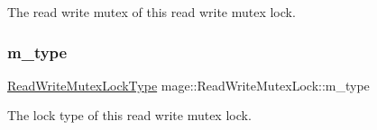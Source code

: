 The read write mutex of this read write mutex lock. \hypertarget{structmage_1_1_read_write_mutex_lock_aa117ffe94f6850ddc91ad6d1389fb6e2}{}\label{structmage_1_1_read_write_mutex_lock_aa117ffe94f6850ddc91ad6d1389fb6e2} 
\subsubsection{\texorpdfstring{m\+\_\+type}{m\_type}}
{\footnotesize\ttfamily \hyperlink{namespacemage_afd76fcca37ce5c5b2227671290973c74}{Read\+Write\+Mutex\+Lock\+Type} mage\+::\+Read\+Write\+Mutex\+Lock\+::m\+\_\+type\hspace{0.3cm}{\ttfamily [private]}}

The lock type of this read write mutex lock. 